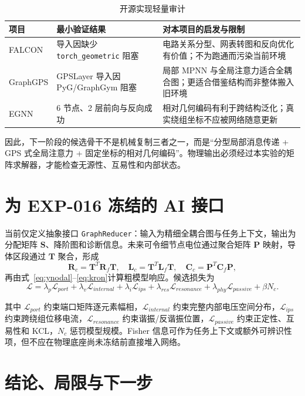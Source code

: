\documentclass[11pt,a4paper]{ctexart}
\newcommand{\mat}[1]{\bm{#1}}
\newcommand{\code}[1]{\texttt{#1}}
\begin{document}
\begin{table}[H]\centering\small
\caption{开源实现轻量审计}\label{tab:audit}
\begin{tabularx}{\textwidth}{p{2.2cm}p{4.0cm}X}
\toprule
项目 & 最小验证结果 & 对本项目的启发与限制\\
\midrule
FALCON & 导入因缺少 \code{torch\_geometric} 阻塞 & 电路关系分型、网表转图和反向优化有价值；不为跑通而污染当前环境\\
GraphGPS & GPSLayer 导入因 PyG/GraphGym 阻塞 & 局部 MPNN 与全局注意力适合全耦合图；更适合借鉴结构而非整体搬入旧环境\\
EGNN & 6 节点、2 层前向与反向成功 & 相对几何编码有利于跨结构泛化；真实绕组坐标不应被网络随意更新\\
\bottomrule
\end{tabularx}
\end{table}

因此，下一阶段的候选骨干不是机械复制三者之一，而是“分型局部消息传递 + GPS 式全局注意力 + 固定坐标的相对几何编码”。物理输出必须经过本实验的矩阵求解器，才能检查无源性、互易性和内部状态。

\section{为 EXP-016 冻结的 AI 接口}

当前仅定义抽象接口 \code{GraphReducer}：输入为精细全耦合图与任务上下文，输出为分配矩阵 \(\mat S\)、降阶图和诊断信息。未来可令细节点电位通过聚合矩阵 \(\mat P\) 映射，导体区段通过 \(\mat T\) 聚合，形成
\begin{equation}
\mat R_c=\mat T^T\mat R_f\mat T,\quad
\mat L_c=\mat T^T\mat L_f\mat T,\quad
\mat C_c=\mat P^T\mat C_f\mat P,
\end{equation}
再由式~\eqref{eq:ynodal}--\eqref{eq:kron}计算粗模型响应。候选损失为
\begin{equation}
\mathcal L=\lambda_p\mathcal L_{port}+\lambda_v\mathcal L_{internal}
+\lambda_i\mathcal L_{ips}+\lambda_{res}\mathcal L_{resonance}
+\lambda_{phy}\mathcal L_{passive}+\beta N_c.
\end{equation}

其中 \(\mathcal L_{port}\) 约束端口矩阵逐元素幅相，\(\mathcal L_{internal}\) 约束完整内部电压空间分布，\(\mathcal L_{ips}\) 约束跨绕组位移电流，\(\mathcal L_{resonance}\) 约束谐振/反谐振位置，\(\mathcal L_{passive}\) 约束正定性、互易性和 KCL，\(N_c\) 惩罚模型规模。Fisher 信息可作为任务上下文或额外可辨识性项，但不应在物理底座尚未冻结前直接堆入网络。

\section{结论、局限与下一步}
\end{document}
